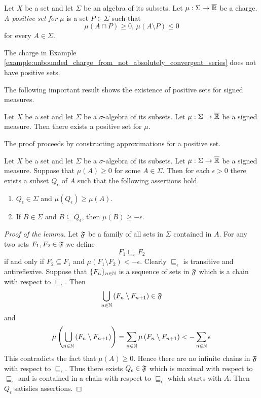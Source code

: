 \begin{definition}
    Let $X$ be a set and let $\Sigma$ be an algebra of its subsets. Let $\mu:\Sigma \rightarrow \overline{{\mathbb R}}$ be a charge. \textit{A positive set for $\mu$} is a set $P \in \Sigma$ such that
    $$\mu(A\cap P) \geq 0,\,\mu(A\setminus P)\leq 0$$
    for every $A \in \Sigma$.
\end{definition}

\begin{example}\label{example:not_every_charge_has_positive_set}
    The charge in Example \ref{example:unbounded_charge_from_not_absolutely_convergent_series} does not have positive sets.
\end{example}
\noindent
The following important result shows the existence of positive sets for signed measures.

\begin{theorem}[Hahn]\label{theorem:Hahn_decomposition}
    Let $X$ be a set and let $\Sigma$ be a $\sigma$-algebra of its subsets. Let $\mu:\Sigma \rightarrow \overline{{\mathbb R}}$ be a signed measure. Then there exists a positive set for $\mu$.
\end{theorem}
\noindent
The proof proceeds by constructing approximations for a positive set.

\begin{lemma}\label{lemma:approximate_positive_set}
    Let $X$ be a set and let $\Sigma$ be a $\sigma$-algebra of its subsets. Let $\mu:\Sigma \rightarrow \overline{{\mathbb R}}$ be a signed measure. Suppose that $\mu(A) \geq 0$ for some $A \in \Sigma$. Then for each $\epsilon > 0$ there exists a subset $Q_{\epsilon}$ of $A$ such that the following assertions hold.
    \begin{enumerate}[label=\emph{\textbf{(\arabic*)}}, leftmargin=3.0em]
        \item $Q_{\epsilon} \in \Sigma$ and $\mu(Q_{\epsilon}) \geq \mu(A)$.
        \item If $B \in \Sigma$ and $B \subseteq Q_{\epsilon}$, then $\mu(B) \geq -\epsilon$.
    \end{enumerate}
\end{lemma}
\begin{proof}[Proof of the lemma]
    Let ${\mathfrak F}$ be a family of all sets in $\Sigma$ contained in $A$. For any two sets $F_1,F_2\in {\mathfrak F}$ we define
    $$F_1 \sqsubseteq_{\epsilon}F_2$$
    if and only if $F_2 \subseteq F_1$ and $\mu(F_1 \setminus F_2) < -\epsilon$. Clearly $\sqsubseteq_{\epsilon}$ is transitive and antireflexive. Suppose that $\{F_n\}_{n\in {\mathbb N}}$ is a sequence of sets in ${\mathfrak F}$ which is a chain with respect to $\sqsubseteq_{\epsilon}$. Then
    $$\bigcup_{n\in {\mathbb N}}\left(F_n\setminus F_{n+1}\right) \in {\mathfrak F}$$
    and
    $$\mu\left(\bigcup_{n\in {\mathbb N}}\left(F_n\setminus F_{n+1}\right)\right) = \sum_{n\in {\mathbb N}}\mu\left(F_n\setminus F_{n+1}\right) < -\sum_{n\in {\mathbb N}}\epsilon$$
    This contradicts the fact that $\mu(A) \geq 0$. Hence there are no infinite chains in ${\mathfrak F}$ with respect to $\sqsubseteq_{\epsilon}$. Thus there exists $Q_{\epsilon} \in {\mathfrak F}$ which is maximal with respect to $\sqsubseteq_{\epsilon}$ and is contained in a chain with respect to $\sqsubseteq_{\epsilon}$ which starts with $A$. Then $Q_{\epsilon}$ satisfies assertions.
\end{proof}

